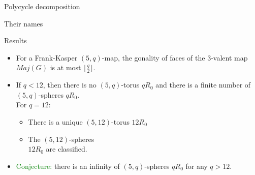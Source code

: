 \documentclass[%
pdf,
colorBG,
slideColor,
]{prosper}
\begin{document}
{\begin{slide}{Polycycle decomposition}
{\begin{center}
\begin{minipage}{8.4cm}
Their names
\end{minipage}
\end{center}
}

\end{slide}
}


\begin{slide}{Results}
\begin{itemize}
\item For a Frank-Kasper $(5,q)$-map, the gonality of faces of the $3$-valent map $Maj(G)$ is at most $\lfloor \frac{q}{2}\rfloor$.
\item If $q<12$, then there is no $(5,q)$-torus $qR_0$ and there is a finite number of $(5,q)$-spheres $qR_0$.\\
For $q=12$:

\begin{minipage}{5.2cm}
\begin{itemize}
\item There is a unique $(5,12)$-torus $12R_0$
\item The $(5,12)$-spheres\\
$12R_0$ are classified.
\end{itemize}
\vspace{0.7cm}
\end{minipage}
\begin{minipage}{5.2cm}
\centering
{}\par
\end{minipage}
\item \textcolor{green}{Conjecture:} there is an infinity of $(5,q)$-spheres $qR_0$ for any $q>12$.
\end{itemize}
\end{slide}
\end{document}
